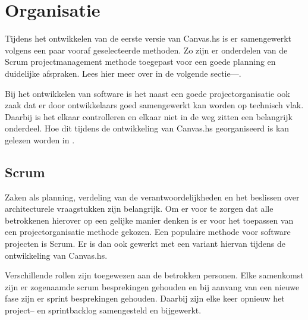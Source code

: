 \chapter{Organisatie} \label{hoofdstuk:organisatie}
Tijdens het ontwikkelen van de eerste versie van Canvas.hs is er samengewerkt volgens een paar vooraf geselecteerde methoden. Zo zijn er onderdelen van de Scrum projectmanagement methode toegepast voor een goede planning en duidelijke afspraken. Lees hier meer over in de volgende sectie—.

Bij het ontwikkelen van software is het naast een goede projectorganisatie ook zaak dat er door ontwikkelaars goed samengewerkt kan worden op technisch vlak. Daarbij is het elkaar controlleren en elkaar niet in de weg zitten een belangrijk onderdeel. Hoe dit tijdens de ontwikkeling van Canvas.hs georganiseerd is kan gelezen worden in .

\section{Scrum} \label{sec:scrum}
Zaken als planning, verdeling van de verantwoordelijkheden en het beslissen over architecturele vraagstukken zijn belangrijk. Om er voor te zorgen dat alle betrokkenen hierover op een gelijke manier denken is er voor het toepassen van een projectorganisatie methode gekozen. Een populaire methode voor software projecten is Scrum. Er is dan ook gewerkt met een variant hiervan tijdens de ontwikkeling van Canvas.hs.

Verschillende rollen zijn toegewezen aan de betrokken personen. Elke samenkomst zijn er zogenaamde scrum besprekingen gehouden en bij aanvang van een nieuwe fase zijn er sprint besprekingen gehouden. Daarbij zijn elke keer opnieuw het project– en sprintbacklog samengesteld en bijgewerkt.

